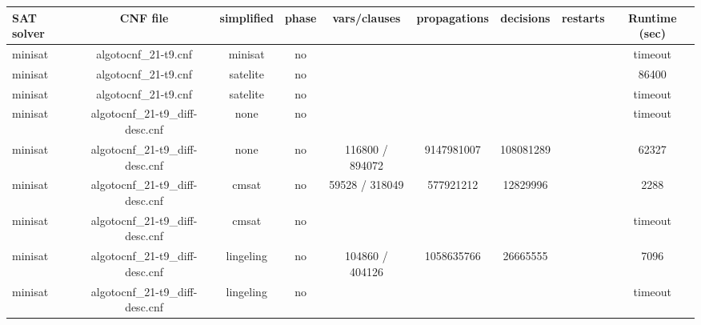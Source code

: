 \begin{appendices}
\begin{table}[p]
  \begin{center}
    \begin{tabular}{l|cccccccc}
        \textbf{SAT solver} & \textbf{CNF file} & \textbf{simplified} & \textbf{phase} & \textbf{vars/clauses} & \textbf{propagations} & \textbf{decisions} & \textbf{restarts} & \textbf{Runtime (sec)} \\
      \hline
  minisat                        & algotocnf\_21-t9.cnf           & minisat    & no    &            &           &           &            & timeout \\ %
  minisat                        & algotocnf\_21-t9.cnf           & satelite   & no    &            &           &           &            & 86400 \\ %
  minisat                        & algotocnf\_21-t9.cnf           & satelite   & no    &            &           &           &            & timeout \\ %
  minisat                        & algotocnf\_21-t9\_diff-desc.cnf & none       & no    &            &           &           &            & timeout \\ %
  minisat                        & algotocnf\_21-t9\_diff-desc.cnf & none       & no    & 116800 / 894072 & 9147981007 & 108081289 &            & 62327 \\ %
  minisat                        & algotocnf\_21-t9\_diff-desc.cnf & cmsat      & no    & 59528 / 318049 & 577921212 & 12829996  &            & 2288 \\ %
  minisat                        & algotocnf\_21-t9\_diff-desc.cnf & cmsat      & no    &            &           &           &            & timeout \\ %
  minisat                        & algotocnf\_21-t9\_diff-desc.cnf & lingeling  & no    & 104860 / 404126 & 1058635766 & 26665555  &            & 7096 \\ %
  minisat                        & algotocnf\_21-t9\_diff-desc.cnf & lingeling  & no    &            &           &           &            & timeout \\ %

\end{tabular}
\end{center}
\end{table}
\end{appendices}
